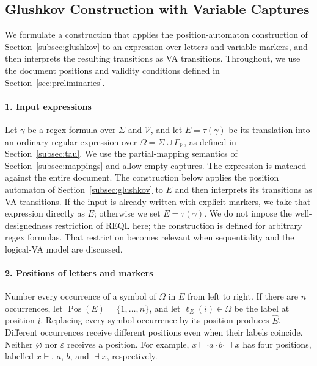 
\subsection{Glushkov Construction with Variable Captures}
\label{subsec:glushkov-captures}

We formulate a construction that applies the position-automaton
construction of Section~\ref{subsec:glushkov} to an expression over
letters and variable markers, and then interprets the resulting
transitions as VA transitions. Throughout, we use the document positions
and validity conditions defined in Section~\ref{sec:preliminaries}.

\paragraph{1. Input expressions}
Let $\gamma$ be a regex formula over $\Sigma$ and $\mathcal V$, and let
$E=\tau(\gamma)$ be its translation into an ordinary regular expression
over $\Omega=\Sigma\cup\Gamma_{\mathcal V}$, as defined in
Section~\ref{subsec:tau}. We use the partial-mapping semantics of
Section~\ref{subsec:mappings} and allow empty captures. The expression
is matched against the entire document. The construction below applies
the position automaton of Section~\ref{subsec:glushkov} to $E$ and then
interprets its transitions as VA transitions. If the input is already
written with explicit markers, we take that expression directly as $E$;
otherwise we set $E=\tau(\gamma)$. We do not impose the well-designedness
restriction of REQL here; the construction is defined for arbitrary regex
formulas. That restriction becomes relevant when sequentiality and the
logical-VA model are discussed.

\paragraph{2. Positions of letters and markers}
Number every occurrence of a symbol of $\Omega$ in $E$ from left to right.
If there are $n$ occurrences, let $\operatorname{Pos}(E)=\{1,\ldots,n\}$,
and let $\ell_E(i)\in\Omega$ be the label at position $i$.
Replacing every symbol occurrence by its position produces $\widehat{E}$.
Different occurrences receive different positions even when their labels
coincide. Neither $\varnothing$ nor $\varepsilon$ receives a position.
For example, $x\vdash\cdot a\cdot b\cdot\dashv x$ has four positions,
labelled $x\vdash$, $a$, $b$, and $\dashv x$, respectively.

